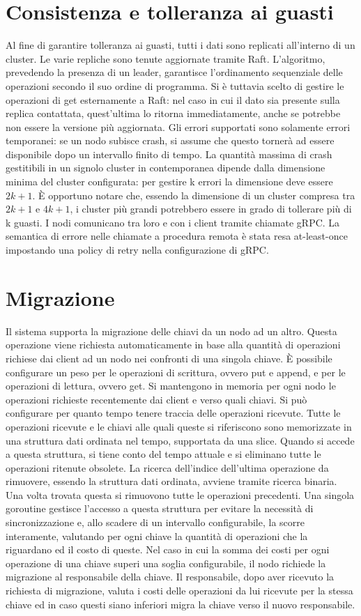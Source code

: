 \documentclass[conference]{IEEEtran}
\begin{document}
\section{Consistenza e tolleranza ai guasti}
Al fine di garantire tolleranza ai guasti, tutti i dati sono replicati all'interno di un cluster. Le varie repliche sono tenute aggiornate
tramite Raft. L'algoritmo, prevedendo la presenza di un leader, garantisce l'ordinamento sequenziale delle operazioni
secondo il suo ordine di programma. Si è tuttavia scelto di gestire le operazioni di get esternamente a Raft: nel caso
in cui il dato sia presente sulla replica contattata, quest'ultima lo ritorna immediatamente, anche se potrebbe non essere
la versione più aggiornata. Gli errori supportati sono solamente errori temporanei: se un nodo subisce crash, si assume
che questo tornerà ad essere disponibile dopo un intervallo finito di tempo. La quantità massima di crash gestitibili
in un signolo cluster in contemporanea dipende dalla dimensione minima del cluster configurata: per gestire k errori la
dimensione deve essere \(2k+1\). È opportuno notare che, essendo la dimensione di un cluster compresa tra \(2k+1\) e
\(4k+1\), i cluster più grandi potrebbero essere in grado di tollerare più di k guasti. I nodi comunicano tra loro e con
i client tramite chiamate gRPC. La semantica di errore nelle chiamate a procedura remota è stata resa at-least-once impostando
una policy di retry nella configurazione di gRPC.

\section{Migrazione}
Il sistema supporta la migrazione delle chiavi da un nodo ad un altro. Questa operazione viene richiesta automaticamente
in base alla quantità di operazioni richiese dai client ad un nodo nei confronti di una singola chiave. È possibile configurare
un peso per le operazioni di scrittura, ovvero put e append, e per le operazioni di lettura, ovvero get. Si mantengono
in memoria per ogni nodo le operazioni richieste recentemente dai client e verso quali chiavi.
Si può configurare per quanto tempo tenere traccia delle operazioni ricevute. Tutte le operazioni ricevute e le chiavi
alle quali queste si riferiscono sono memorizzate in una struttura dati ordinata nel tempo, supportata da una slice.
Quando si accede a questa struttura, si tiene conto del tempo attuale e si eliminano tutte le operazioni ritenute obsolete.
La ricerca dell'indice dell'ultima operazione da rimuovere, essendo la struttura dati ordinata, avviene tramite ricerca
binaria. Una volta trovata questa si rimuovono tutte le operazioni precedenti. Una singola goroutine gestisce l'accesso a questa
struttura per evitare la necessità di sincronizzazione e, allo scadere di un intervallo configurabile, la scorre interamente,
valutando per ogni chiave la quantità di operazioni che la riguardano ed il costo di queste. Nel caso in cui la somma dei
costi per ogni operazione di una chiave superi una soglia configurabile, il nodo richiede la migrazione al responsabile della chiave.
Il responsabile, dopo aver ricevuto la richiesta di migrazione, valuta i costi delle operazioni da lui ricevute per la stessa
chiave ed in caso questi siano inferiori migra la chiave verso il nuovo responsabile.
\end{document}
